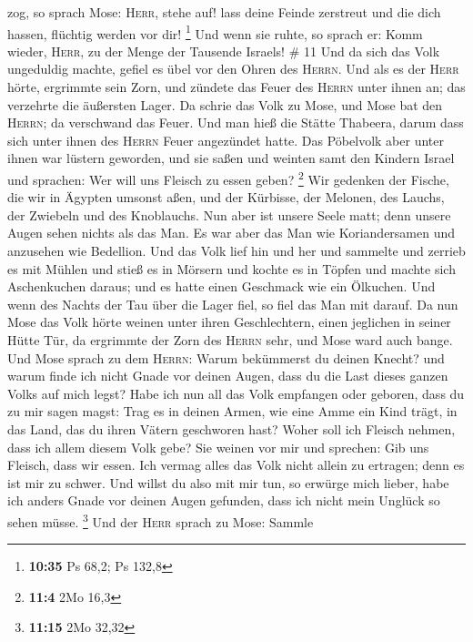 zog, so sprach Mose: \textsc{Herr}, stehe auf! lass deine Feinde
zerstreut und die dich hassen, flüchtig werden vor dir! \footnote{\textbf{10:35}
  Ps 68,2; Ps 132,8}  Und wenn sie ruhte, so sprach er:
Komm wieder, \textsc{Herr}, zu der Menge der Tausende Israels! \# 11
 Und da sich das Volk ungeduldig machte, gefiel es übel
vor den Ohren des \textsc{Herrn}. Und als es der \textsc{Herr} hörte,
ergrimmte sein Zorn, und zündete das Feuer des \textsc{Herrn} unter
ihnen an; das verzehrte die äußersten Lager.  Da schrie
das Volk zu Mose, und Mose bat den \textsc{Herrn}; da verschwand das
Feuer.  Und man hieß die Stätte Thabeera, darum dass sich
unter ihnen des \textsc{Herrn} Feuer angezündet hatte. 
Das Pöbelvolk aber unter ihnen war lüstern geworden, und sie saßen und
weinten samt den Kindern Israel und sprachen: Wer will uns Fleisch zu
essen geben? \footnote{\textbf{11:4} 2Mo 16,3}  Wir
gedenken der Fische, die wir in Ägypten umsonst aßen, und der Kürbisse,
der Melonen, des Lauchs, der Zwiebeln und des Knoblauchs. 
Nun aber ist unsere Seele matt; denn unsere Augen sehen nichts als das
Man.  Es war aber das Man wie Koriandersamen und anzusehen
wie Bedellion.  Und das Volk lief hin und her und sammelte
und zerrieb es mit Mühlen und stieß es in Mörsern und kochte es in
Töpfen und machte sich Aschenkuchen daraus; und es hatte einen Geschmack
wie ein Ölkuchen.  Und wenn des Nachts der Tau über die
Lager fiel, so fiel das Man mit darauf.  Da nun Mose das
Volk hörte weinen unter ihren Geschlechtern, einen jeglichen in seiner
Hütte Tür, da ergrimmte der Zorn des \textsc{Herrn} sehr, und Mose ward
auch bange.  Und Mose sprach zu dem \textsc{Herrn}: Warum
bekümmerst du deinen Knecht? und warum finde ich nicht Gnade vor deinen
Augen, dass du die Last dieses ganzen Volks auf mich legst?
 Habe ich nun all das Volk empfangen oder geboren, dass
du zu mir sagen magst: Trag es in deinen Armen, wie eine Amme ein Kind
trägt, in das Land, das du ihren Vätern geschworen hast? 
Woher soll ich Fleisch nehmen, dass ich allem diesem Volk gebe? Sie
weinen vor mir und sprechen: Gib uns Fleisch, dass wir essen.
 Ich vermag alles das Volk nicht allein zu ertragen; denn
es ist mir zu schwer.  Und willst du also mit mir tun, so
erwürge mich lieber, habe ich anders Gnade vor deinen Augen gefunden,
dass ich nicht mein Unglück so sehen müsse. \footnote{\textbf{11:15} 2Mo
  32,32}  Und der \textsc{Herr} sprach zu Mose: Sammle
